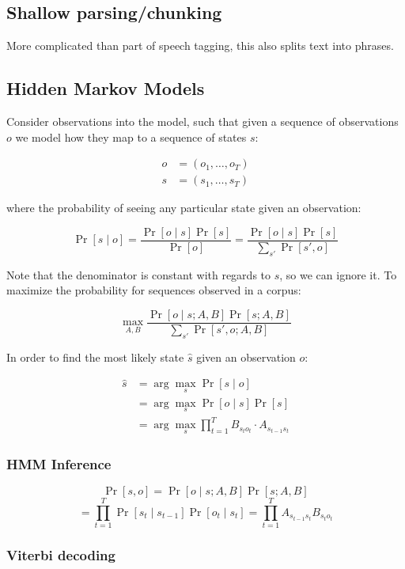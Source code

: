 \documentclass{idc_msc}
\begin{document}
\subsection{Shallow parsing/chunking}

More complicated than part of speech tagging, this also splits text into phrases.

\subsection{Hidden Markov Models}

Consider observations into the model, such that given a sequence of observations \(o\) we model how they map to a sequence of states \(s\):

\[
\begin{aligned}
  o &= (o_1, \ldots, o_T) \\
  s &= (s_1, \ldots, s_T)
\end{aligned}
\]

where the probability of seeing any particular state given an observation:

\[
  \Pr[s \mid o] =
  \frac{\Pr[o \mid s] \Pr[s]}{\Pr[o]} =
  \frac{\Pr[o \mid s] \Pr[s]}{\sum_{s'} \Pr[s', o]}
\]

Note that the denominator is constant with regards to \(s\), so we can ignore it.
To maximize the probability for sequences observed in a corpus:

\[
  \max_{A,B} \frac{\Pr[o \mid s; A, B] \Pr[s; A, B]}{\sum_{s'} \Pr[s', o; A, B]}
\]

In order to find the most likely state \(\hat{s}\) given an observation \(o\):

\[
\begin{aligned}
  \hat{s} &= \arg \max_s \Pr[s \mid o] \\
  &= \arg \max_s \Pr[o \mid s] \Pr[s] \\
  &= \arg \max_s \prod_{t = 1}^T B_{s_t o_t} \cdot A_{s_{t-1} s_t}
\end{aligned}
\]

\subsubsection{HMM Inference}

\[
  \Pr[s, o] = \Pr[o \mid s; A, B] \Pr[s; A, B]
\]
\[
  = \prod_{t=1}^T \Pr[s_t \mid s_{t-1}] \Pr[o_t \mid s_t]
  = \prod_{t=1}^T A_{s_{t-1} s_t} B_{s_t o_t}
\]

\subsubsection{Viterbi decoding}
\end{document}
